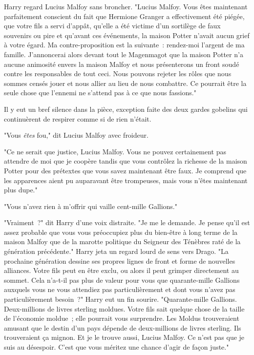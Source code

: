 Harry regard Lucius Malfoy sans broncher. "Lucius Malfoy. Vous êtes maintenant parfaitement conscient du fait que Hermione Granger a effectivement été piégée, que votre fils a servi d'appât, qu'elle a été victime d'un sortilège de faux souvenirs ou pire et qu'avant ces événements, la maison Potter n'avait aucun grief à votre égard. Ma contre-proposition est la suivante~: rendez-moi l'argent de ma famille. J'annoncerai alors devant tout le Magenmagot que la maison Potter n'a aucune animosité envers la maison Malfoy et nous présenterons un front soudé contre les responsables de tout ceci. Nous pouvons rejeter les rôles que nous sommes censés jouer et nous allier au lieu de nous combattre. Ce pourrait être la seule chose que l'ennemi ne s'attend pas à ce que nous fassions."

Il y eut un bref silence dans la pièce, exception faite des deux gardes gobelins qui continuèrent de respirer comme si de rien n'était.

"Vous \emph{êtes} fou," dit Lucius Malfoy avec froideur.

"Ce ne serait que justice, Lucius Malfoy. Vous ne pouvez certainement pas attendre de moi que je coopère tandis que vous contrôlez la richesse de la maison Potter pour des prétextes que vous savez maintenant être faux. Je comprend que les apparences aient pu auparavant être trompeuses, mais vous n'êtes maintenant plus dupe."

"Vous n'avez rien à m'offrir qui vaille cent-mille Gallions."

"Vraiment~?" dit Harry d'une voix distraite. "Je me le demande. Je pense qu'il est assez probable que vous vous préoccupiez plus du bien-être à long terme de la maison Malfoy que de la marotte politique du Seigneur des Ténèbres raté de la génération précédente." Harry jeta un regard lourd de sens vers Drago. "La prochaine génération dessine ses propres lignes de front et forme de nouvelles alliances. Votre fils peut en être exclu, ou alors il peut grimper directement au sommet. Cela n'a-t-il pas plus de valeur pour vous que quarante-mille Gallions auxquels vous ne vous attendiez pas particulièrement et dont vous n'avez pas particulièrement besoin~?" Harry eut un fin sourire. "Quarante-mille Gallions. Deux-millions de livres sterling moldues. Votre fils sait quelque chose de la taille de l'économie moldue~; elle pourrait vous surprendre. Les Moldus trouveraient amusant que le destin d'un pays dépende de deux-millions de livres sterling. Ils trouveraient ça mignon. Et je le trouve aussi, Lucius Malfoy. Ce n'est pas que je suis au désespoir. C'est que vous méritez une chance d'agir de façon juste."


